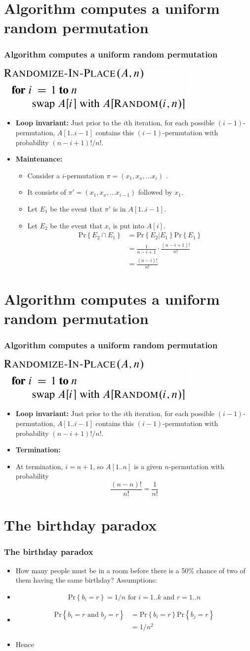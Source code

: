 \documentclass{beamer}
\newcommand{\bi}{\begin{itemize}}
\newcommand{\ei}{\end{itemize}}
\newcommand{\sect}[1]{
\section{#1}
\begin{frame}[fragile]\frametitle{#1}
}
\newcommand{\pr}[1]{\ensuremath{\mbox{Pr}\left\{#1\right\}}}
\begin{document}
\sect{Algorithm computes a uniform random
  permutation}
\includegraphics{Randomize-In-Place.pdf}
\bi
\item {\bf Loop invariant:}
  Just prior to the $i$th iteration, for each possible
  $(i-1)$-permutation,  $A[1..i-1]$ contains this $(i-1)$-permutation
  with probability $(n-i+1)!/n!$.
\item {\bf Maintenance:}
  \pause
\bi
\item
  Consider a $i$-permutation $\pi = (x_1,x_x,...x_i)$ .
\item
  It consists of $\pi' = (x_1,x_x,...x_{i-1})$ followed by $x_1$.
\item
  Let $E_1$ be the event that $\pi'$ is in $A[1..i-1]$.
\item
  Let $E_2$ be the event that $x_i$ is put into $A[i]$.
  \begin{align*}
    \pr{E_2 \cap E_1} &= \pr{E_2 | E_1} \pr{E_1}\\
    &= \frac{1}{n-i+1} \cdot \frac{(n-i+1)!}{n!} \\
    &= \frac{(n-i)!}{n!}
  \end{align*}
  
\ei
\ei
\end{frame}


\sect{Algorithm computes a uniform random
  permutation}
\includegraphics{Randomize-In-Place.pdf}
\vfill
\bi
\item {\bf Loop invariant:}
  Just prior to the $i$th iteration, for each possible
  $(i-1)$-permutation,  $A[1..i-1]$ contains this $(i-1)$-permutation
  with probability $(n-i+1)!/n!$.
\item {\bf Termination:}
  \pause
\item
  At termination, $i=n+1$, so $A[1..n]$ is a given $n$-permutation
  with probability
  \[
  \frac{(n-n)!}{n!} = \frac{1}{n!}
  \]
\ei
\end{frame}



\sect{The birthday paradox}
\bi
\item
How many people must be in a room before there is a 50\% chance of two
of them having the same birthday? Assumptions:
\item
 \[\pr{b_i = r} = 1/n\mbox{ for }i=1..k\mbox{ and }r=1..n\]
\item
  \begin{align*}
    \pr{b_i=r \mbox{ and } b_j=r} &=
    \pr{b_i=r}\pr{b_j=r}\\ &= 1/n^2
    \end{align*}
\item Hence
  
\ei
\end{frame}
\end{document}
